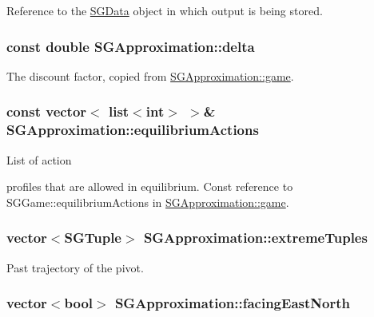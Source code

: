 Reference to the \hyperlink{classSGData}{S\-G\-Data} object in which output is being stored. \hypertarget{classSGApproximation_a2db391ef9ba9edc0313ddfd627bf6d48}{
\subsubsection[{delta}]{\setlength{\rightskip}{0pt plus 5cm}const double S\-G\-Approximation\-::delta\hspace{0.3cm}{\ttfamily [private]}}}\label{classSGApproximation_a2db391ef9ba9edc0313ddfd627bf6d48}
The discount factor, copied from \hyperlink{classSGApproximation_a3244a3d7de5f2b909d438f5b4ab337ee}{S\-G\-Approximation\-::game}. \hypertarget{classSGApproximation_a1fffdb10af241d7c2e8591b661435c3d}{
\subsubsection[{equilibrium\-Actions}]{\setlength{\rightskip}{0pt plus 5cm}const vector$<$ list$<$int$>$ $>$\& S\-G\-Approximation\-::equilibrium\-Actions\hspace{0.3cm}{\ttfamily [private]}}}\label{classSGApproximation_a1fffdb10af241d7c2e8591b661435c3d}
\begin{DoxyVerb}         List of action
\end{DoxyVerb}
 profiles that are allowed in equilibrium. Const reference to S\-G\-Game\-::equilibrium\-Actions in \hyperlink{classSGApproximation_a3244a3d7de5f2b909d438f5b4ab337ee}{S\-G\-Approximation\-::game}. \hypertarget{classSGApproximation_ac55fd302328ae8fbe4d1f8cf24a7ba32}{
\subsubsection[{extreme\-Tuples}]{\setlength{\rightskip}{0pt plus 5cm}vector$<${\bf S\-G\-Tuple}$>$ S\-G\-Approximation\-::extreme\-Tuples\hspace{0.3cm}{\ttfamily [private]}}}\label{classSGApproximation_ac55fd302328ae8fbe4d1f8cf24a7ba32}
Past trajectory of the pivot. \hypertarget{classSGApproximation_a35e422ed70d04b22ea8719cbc0f2fb6a}{
\subsubsection[{facing\-East\-North}]{\setlength{\rightskip}{0pt plus 5cm}vector$<$bool$>$ S\-G\-Approximation\-::facing\-East\-North\hspace{0.3cm}{\ttfamily [private]}}}\label{classSGApproximation_a35e422ed70d04b22ea8719cbc0f2fb6a}

